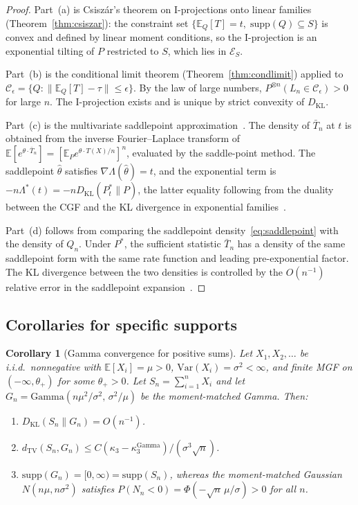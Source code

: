 \documentclass[aps,pre,twocolumn,superscriptaddress,nofootinbib]{revtex4-2}
\newtheorem{corollary}[theorem]{Corollary}
\theoremstyle{definition}
\theoremstyle{remark}
\newcommand{\E}{\mathbb{E}}
\newcommand{\Var}{\mathrm{Var}}
\newcommand{\KL}{D_{\mathrm{KL}}}
\newcommand{\TV}{d_{\mathrm{TV}}}
\newcommand{\supp}{\mathrm{supp}}
\begin{document}
\begin{proof}
Part~(a) is Csisz\'{a}r's theorem on I-projections onto linear families
(Theorem~\ref{thm:csiszar}): the constraint set $\{\E_Q[T]=t,\;\supp(Q)\subseteq S\}$
is convex and defined by linear moment conditions, so the I-projection is an
exponential tilting of $P$ restricted to $S$, which lies in $\mathcal{E}_S$.

Part~(b) is the conditional limit theorem (Theorem~\ref{thm:condlimit}) applied
to $\mathcal{C}_\epsilon=\{Q:\|\E_Q[T]-\tau\|\le\epsilon\}$.  By the law of
large numbers, $P^{\otimes n}(L_n\in\mathcal{C}_\epsilon)>0$ for large $n$.
The I-projection exists and is unique by strict convexity of $\KL$.

Part~(c) is the multivariate saddlepoint
approximation~\cite{BarndorffNielsen1979,Jensen1995}.  The density of
$\bar{T}_n$ at $t$ is obtained from the inverse Fourier--Laplace transform of
$\E[e^{\theta\cdot\bar{T}_n}]=[\E_P e^{\theta\cdot T(X)/n}]^n$, evaluated by
the saddle-point method.  The saddlepoint $\hat\theta$ satisfies
$\nabla\Lambda(\hat\theta)=t$, and the exponential term is
$-n\Lambda^*(t)=-n\KL(P^*_t\|P)$, the latter equality following from the
duality between the CGF and the KL divergence in exponential
families~\cite{AmariNagaoka2000}.

Part~(d) follows from comparing the saddlepoint density~\eqref{eq:saddlepoint}
with the density of $Q_n$.  Under $P^*$, the sufficient statistic $\bar{T}_n$
has a density of the same saddlepoint form with the same rate function and
leading pre-exponential factor.  The KL divergence between the two densities
is controlled by the $O(n^{-1})$ relative error in the saddlepoint
expansion~\cite{Jensen1995}.
\end{proof}

\subsection{Corollaries for specific supports}

\begin{corollary}[Gamma convergence for positive sums]\label{thm:gamma}
Let $X_1,X_2,\ldots$ be i.i.d.\ nonnegative with $\E[X_i]=\mu>0$,
$\Var(X_i)=\sigma^2<\infty$, and finite MGF on $(-\infty,\theta_+)$ for some
$\theta_+>0$.  Let $S_n=\sum_{i=1}^n X_i$ and let
$G_n=\mathrm{Gamma}(n\mu^2/\sigma^2,\,\sigma^2/\mu)$ be the moment-matched
Gamma.  Then:
\begin{enumerate}
\item[\rm(i)] $\KL(S_n\|G_n)=O(n^{-1})$.
\item[\rm(ii)] $\TV(S_n,G_n)\le C(\kappa_3-\kappa_3^{\mathrm{Gamma}})/
(\sigma^3\sqrt{n})$.
\item[\rm(iii)] $\supp(G_n)=[0,\infty)=\supp(S_n)$, whereas the
moment-matched Gaussian $N(n\mu,n\sigma^2)$ satisfies
$P(N_n<0)=\Phi(-\sqrt{n}\,\mu/\sigma)>0$ for all $n$.
\end{enumerate}
\end{corollary}
\end{document}

